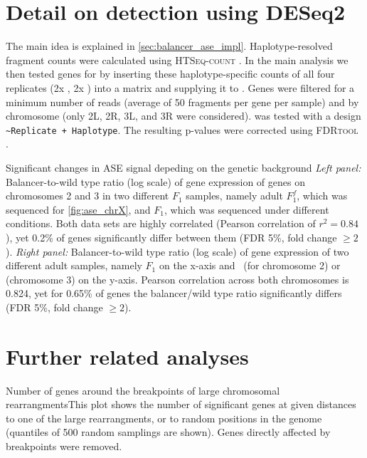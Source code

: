 \section{Detail on \texorpdfstring{\ase}{ASE} detection using DESeq2}
\label{sec:suppl_deseq}
The main idea is explained in \cref{sec:balancer_ase_impl}. Haplotype-resolved
fragment counts were calculated using \textsc{HTSeq-count} \citep{Anders2015}.
In the main analysis we then tested genes for \ase by inserting these
haplotype-specific counts of all four replicates (2x \Nmat, 2x \Npat) into a
matrix and supplying it to \deseq. Genes were filtered for a minimum number of
reads (average of 50 fragments per gene per sample) and by chromosome (only 2L,
2R, 3L, and 3R were considered). \deseq was tested with a design
\texttt{\footnotesize \textasciitilde Replicate + Haplotype}. The resulting p-values were corrected using
\textsc{FDRtool} \citep{Strimmer2008}.



    {Significant changes in ASE signal depeding on the genetic background}{
    \textit{Left panel:} Balancer-to-wild type ratio (log scale) of gene
    expression of genes on chromosomes 2 and 3 in two different $F_1$ samples,
    namely adult $F_1^f$, which was sequenced for \cref{fig:ase_chrX}, and $F_1$,
    which was sequenced under different conditions. Both data sets are highly
    correlated (Pearson correlation of $r^2 = 0.84$), yet 0.2\% of genes significantly differ
    between them (FDR 5\%, fold change $\geq 2$).
    \textit{Right panel:} Balancer-to-wild type ratio (log scale) of gene expression
    of two different adult samples, namely $F_1$ on the x-axis and \Fcyo\, (for
    chromosome 2) or \Ftm\, (chromosome 3) on the y-axis. Pearson correlation
    across both chromosomes is 0.824, yet for 0.65\% of genes the balancer/wild
    type ratio significantly differs (FDR 5\%, fold change $\geq 2$).}


\section{Further \texorpdfstring{\ase}{ASE} related analyses}
\label{sec:suppl_ase_more}

    {Number of \texorpdfstring{\ase}{ASE} genes around the breakpoints of large
    chromosomal rearrangments}{This plot shows the number of significant \ase
    genes at given distances to one of the large rearrangments, or to random
    positions in the genome (quantiles of 500 random samplings are shown).
    Genes directly affected by breakpoints were removed.}






